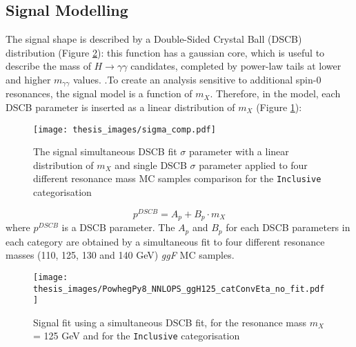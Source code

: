\documentclass[a4paper, oneside, 11pt, openright]{book}
\begin{document}
 			\subsection{Signal Modelling}
 				The signal shape is described by a Double-Sided Crystal Ball (DSCB) distribution (Figure \ref{fig:sig_fit}): this function has a gaussian core, which is useful to describe the mass of $H\to\gamma\gamma$ candidates, completed by power-law tails at lower and higher $m_{\gamma\gamma}$ values.  .To create an analysis sensitive to additional spin-0 resonances, the signal model is a function of $m_X$. Therefore, in the model, each DSCB parameter is inserted as a linear distribution of $m_X$ (Figure \ref{fig:sigma_fit}):
 				\begin{figure}
 					\centering
 					\texttt{[image: thesis\_images/sigma\_comp.pdf]}
 					\caption{The signal simultaneous DSCB fit $\sigma$ parameter with a linear distribution of $m_X$ and single DSCB $\sigma$ parameter applied to four different resonance mass MC samples comparison for the \texttt{Inclusive} categorisation}
 					\label{fig:sigma_fit}
 				\end{figure}
 				\begin{equation}\label{eq:DSCB_par}
 					p^{DSCB} = A_p + B_p\cdot m_X
 				\end{equation}
 				where $p^{DSCB}$ is a DSCB parameter. The $A_p$ and $B_p$ for each DSCB parameters in each category are obtained by a simultaneous fit to four different resonance masses (110, 125, 130 and 140 GeV) \textit{ggF} MC samples.
 				\begin{figure}
 					\centering
 					\texttt{[image: thesis\_images/PowhegPy8\_NNLOPS\_ggH125\_catConvEta\_no\_fit.pdf]}
 					\caption{Signal fit using a simultaneous DSCB fit, for the resonance mass $m_X$ = 125 GeV and for the \texttt{Inclusive} categorisation}
 					\label{fig:sig_fit}
 				\end{figure}
 				
\end{document}
